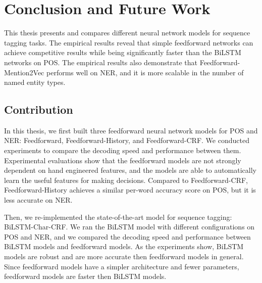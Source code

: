 \documentclass{sfuthesis}
\begin{document}
%
%

\mainmatter%











\chapter{Conclusion and Future Work}

This thesis presents and compares different neural network models for sequence tagging tasks. The empirical results reveal that simple feedforward networks can achieve competitive results while being significantly faster than the BiLSTM networks on POS. The empirical results also demonstrate that Feedforward-Mention2Vec performs well on NER, and it is more scalable in the number of named entity types.

\section{Contribution}
In this thesis, we first built three feedforward neural network models for POS and NER: Feedforward, Feedforward-History, and Feedforward-CRF. We conducted experiments to compare the decoding speed and performance between them. Experimental evaluations show that the feedforward models are not strongly dependent on hand engineered features, and the models are able to automatically learn the useful features for making decisions. Compared to Feedforward-CRF, Feedforward-History achieves a similar per-word accuracy score on POS, but it is less accurate on NER. 

Then, we re-implemented the state-of-the-art model for sequence tagging: BiLSTM-Char-CRF. We ran the BiLSTM model with different configurations on POS and NER, and we compared the decoding speed and performance between BiLSTM models and feedforward models. As the experiments show, BiLSTM models are robust and are more accurate then feedforward models in general. Since feedforward models have a simpler architecture and fewer parameters, feedforward models are faster then BiLSTM models.
\end{document}
